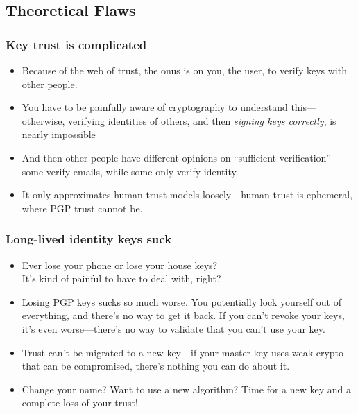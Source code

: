 \documentclass[aspectratio=1610,bigger,utf8]{beamer}
\begin{document}
\subsection{Theoretical Flaws}
\begin{frame}
	\frametitle{Key trust is complicated}
	\begin{itemize}
		\item Because of the web of trust, the onus is on you, the
			user, to verify keys with other people.
		\item You have to be \alert{painfully aware of cryptography} to
			understand this---otherwise, verifying identities of
			others, and then \emph{signing keys correctly}, is
			nearly impossible
		\item And then other people have different opinions on
			``sufficient verification''---some verify emails, while
			some only verify identity.
		\item It only approximates human trust models loosely---human
			trust is ephemeral, where PGP trust cannot be.
	\end{itemize}
\end{frame}
\begin{frame}
	\frametitle{Long-lived identity keys suck}
	\begin{itemize}
		\item Ever lose your phone or lose your house keys?\pause\\
			It's kind of \alert{painful} to have to deal with,
			right?\pause
		\item Losing PGP keys sucks so much worse. You potentially
			lock yourself out of everything, and there's no way to
			get it back. If you can't revoke your keys, it's even
			worse---there's no way to validate that you can't use
			your key.\pause
		\item Trust can't be migrated to a new key---if your master key
			uses weak crypto that can be compromised, there's
			nothing you can do about it.
		\item Change your name? Want to use a new algorithm? Time for a
			new key and a complete loss of your trust!
	\end{itemize}
\end{frame}
\end{document}

